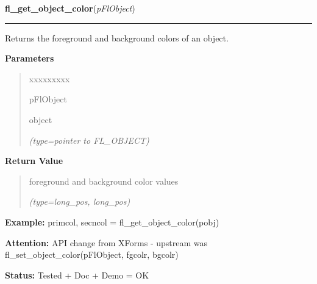     \vspace{0.5ex}

\hspace{.8\funcindent}\begin{boxedminipage}{\funcwidth}

    \raggedright \textbf{fl\_get\_object\_color}(\textit{pFlObject})

    \vspace{-1.5ex}

    \rule{\textwidth}{0.5\fboxrule}
\setlength{\parskip}{2ex}
    Returns the foreground and background colors of an object.

\setlength{\parskip}{1ex}
      \textbf{Parameters}
      \vspace{-1ex}

      \begin{quote}
        \begin{Ventry}{xxxxxxxxx}

          \item[pFlObject]

          object

            {\it (type=pointer to FL\_OBJECT)}

        \end{Ventry}

      \end{quote}

      \textbf{Return Value}
    \vspace{-1ex}

      \begin{quote}
      foreground and background color values

      {\it (type=long\_pos, long\_pos)}

      \end{quote}

\textbf{Example:} primcol, secncol = fl\_get\_object\_color(pobj)



\textbf{Attention:} API change from XForms - upstream was fl\_set\_object\_color(pFlObject, 
fgcolr, bgcolr)



\textbf{Status:} Tested + Doc + Demo = OK



    \end{boxedminipage}

    \label{xformslib:flbasic:fl_set_object_label}

